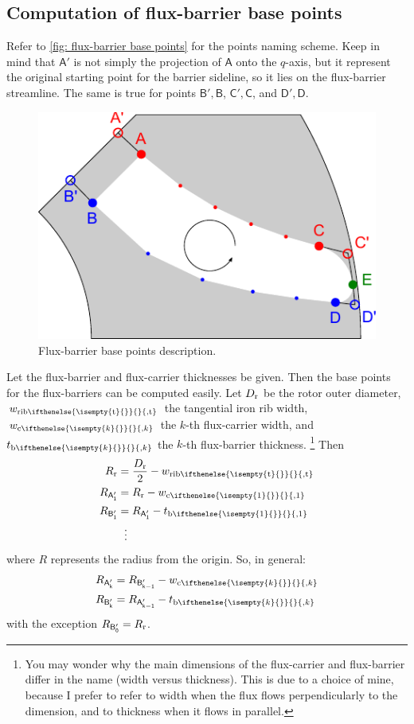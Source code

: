 \documentclass[b5paper,11pt,oneside,fleqn]{article}
\newcommand{\ped}[1]{_\textup{#1}}
\newcommand{\pt}[1]{\mathsf{#1}}
\newcommand{\wc}[1][]{%
w_{\textup{c}
\ifthenelse{\isempty{#1}{}}{}{,#1}%
}}
\newcommand{\tb}[1][]{%
t_{\textup{b}
\ifthenelse{\isempty{#1}{}}{}{,#1}%
}}
\newcommand{\wrib}[1][]{%
w_{\textup{rib}
\ifthenelse{\isempty{#1}{}}{}{,#1}%
}}
\newcommand{\wribt}{\wrib[\text{t}]}
\newcommand{\xth}[1]{$ #1 $-th}
\begin{document}
\subsection{Computation of flux-barrier base points}

Refer to \autoref{fig: flux-barrier base points} for the points naming scheme.
Keep in mind that $ \pt{A}' $ is not simply the projection of $ \pt{A} $ onto 
the $ q $-axis, but it represent the original starting point for the barrier 
sideline, so it lies on the flux-barrier streamline. The same is true for 
points
$ \pt{B}',\pt{B} $, 
$ \pt{C}',\pt{C} $, and
$ \pt{D}',\pt{D} $.

\begin{figure}[tb]
\centering
\includegraphics[width=0.75\linewidth]{gfx/BarrierPoints/BarrierPoints}
\caption{Flux-barrier base points description.}
\label{fig: flux-barrier base points}
\end{figure}

Let the flux-barrier and flux-carrier thicknesses be given.
Then the base points for the flux-barriers can be computed easily.
Let
$ D\ped{r} $ be the rotor outer diameter,
$ \wribt $ the tangential iron rib width,
$ \wc[k] $ the \xth{k} flux-carrier width,
and $ \tb[k] $ the \xth{k} flux-barrier thickness.%
\footnote{%
You may wonder why the main dimensions of the flux-carrier and
flux-barrier differ in the name (width versus thickness).
This is due to a choice of mine,
because I prefer to refer to width when the flux flows perpendicularly to the
dimension,
and to thickness when it flows in parallel.%
}
%
Then
\begin{equation}
\begin{aligned}
R\ped{r} &= \frac{D\ped{r}}{2} - \wribt \\
R_\pt{A_1'} &= R\ped{r} - \wc[1] \\
R_\pt{B_1'} &= R_\pt{A_1'} - \tb[1] \\
    &\:\:\,\vdots
\end{aligned}
\end{equation}
where $ R $ represents the radius from the origin.
%
So, in general:
\begin{equation}
\begin{aligned}
R_\pt{A_k'} &= R_\pt{B_{k-1}'} - \wc[k] \\
R_\pt{B_k'} &= R_\pt{A_{k-1}'} - \tb[k]
\end{aligned}
\end{equation}
with the exception $ R_\pt{B_0'} = R\ped{r} $.
\end{document}
